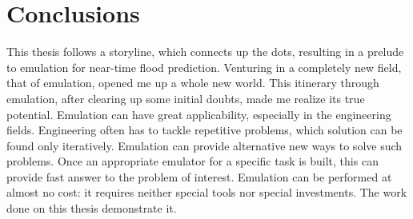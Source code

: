 \chapter{Conclusions}
\label{chp:outlook}






















This thesis follows a storyline, which connects up the dots, resulting in a prelude to emulation for near-time flood prediction.
Venturing in a completely new field, that of emulation, opened me up a whole new world.
This itinerary through emulation, after clearing up some initial doubts, made me realize its true potential.
Emulation can have great applicability, especially in the engineering fields.
Engineering often has to tackle repetitive problems, which solution can be found only iteratively.
Emulation can provide alternative new ways to solve such problems.
Once an appropriate emulator for a specific task is built, this can provide fast answer to the problem of interest.
Emulation can be performed at almost no cost: it requires neither special tools nor special investments.
The work done on this thesis demonstrate it.\\

